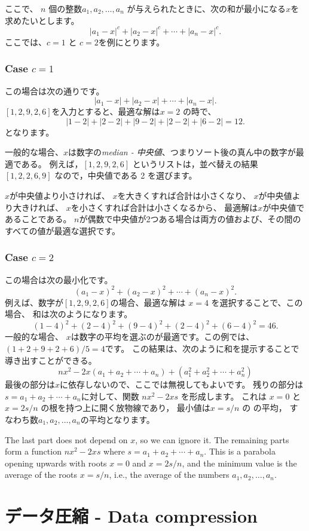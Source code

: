 ここで、 $n$ 個の整数$a_1,a_2,\ldots,a_n$
が与えられたときに、次の和が最小になる$x$を求めたいとします。
\[|a_1-x|^c+|a_2-x|^c+\cdots+|a_n-x|^c.\]
ここでは、$c=1$ と $c=2$を例にとります。

\subsubsection{Case $c=1$}

この場合は次の通りです。
\[|a_1-x|+|a_2-x|+\cdots+|a_n-x|.\]
$[1,2,9,2,6]$を入力とすると、最適な解は$x=2$
の時で、
\[
|1-2|+|2-2|+|9-2|+|2-2|+|6-2|=12.
\]
となります。

一般的な場合、$x$は数字の\textit{median - 中央値}、つまりソート後の真ん中の数字が最適である。
例えば，$[1,2,9,2,6]$ というリストは，並べ替えの結果 $[1,2,2,6,9]$ なので，中央値である 2 を選びます。

$x$が中央値より小さければ、
$x$を大きくすれば合計は小さくなり、
$x$が中央値より大きければ、
$x$を小さくすれば合計は小さくなるから、
最適解は$x$が中央値であることである。
$n$が偶数で中央値が2つある場合は両方の値および、その間のすべての値が最適な選択です。

\subsubsection{Case $c=2$}

この場合は次の最小化です。
\[(a_1-x)^2+(a_2-x)^2+\cdots+(a_n-x)^2.\]
例えば、数字が$[1,2,9,2,6]$の場合、最適な解は $x = 4$ を選択することで、この場合、
和は次のようになります。
\[
(1-4)^2+(2-4)^2+(9-4)^2+(2-4)^2+(6-4)^2=46.
\]
一般的な場合、
$x$は数字の平均を選ぶのが最適です。この例では、$(1+2+9+2+6)/5=4$です。
この結果は、次のように和を提示することで導き出すことができる。
\[
nx^2 - 2x(a_1+a_2+\cdots+a_n) + (a_1^2+a_2^2+\cdots+a_n^2)
\]
最後の部分は$x$に依存しないので、ここでは無視してもよいです。
残りの部分は$s=a_1+a_2+\cdots+a_n$に対して、関数 $nx^2-2xs$ を形成します。
これは $x = 0$ と $x = 2s/n$ の根を持つ上に開く放物線であり，
最小値は$x=s/n$ の の平均，
すなわち数$a_1,a_2,\ldots,a_n$の平均となります。

The last part does not depend on $x$,
so we can ignore it.
The remaining parts form a function
$nx^2-2xs$ where $s=a_1+a_2+\cdots+a_n$.
This is a parabola opening upwards
with roots $x=0$ and $x=2s/n$,
and the minimum value is the average
of the roots $x=s/n$, i.e.,
the average of the numbers $a_1,a_2,\ldots,a_n$.

\section{データ圧縮 - Data compression}

